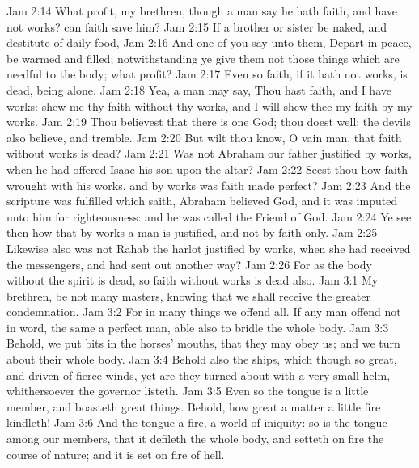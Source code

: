 \vs Jam 2:14 What  profit, my brethren, though a man say he hath faith, and have not works? can faith save him?
\vs Jam 2:15 If a brother or sister be naked, and destitute of daily food,
\vs Jam 2:16 And one of you say unto them, Depart in peace, be  warmed and filled; notwithstanding ye give them not those things which are needful to the body; what  profit?
\vs Jam 2:17 Even so faith, if it hath not works, is dead, being alone.
\vs Jam 2:18 Yea, a man may say, Thou hast faith, and I have works: shew me thy faith without thy works, and I will shew thee my faith by my works.
\vs Jam 2:19 Thou believest that there is one God; thou doest well: the devils also believe, and tremble.
\vs Jam 2:20 But wilt thou know, O vain man, that faith without works is dead?
\vs Jam 2:21 Was not Abraham our father justified by works, when he had offered Isaac his son upon the altar?
\vs Jam 2:22 Seest thou how faith wrought with his works, and by works was faith made perfect?
\vs Jam 2:23 And the scripture was fulfilled which saith, Abraham believed God, and it was imputed unto him for righteousness: and he was called the Friend of God.
\vs Jam 2:24 Ye see then how that by works a man is justified, and not by faith only.
\vs Jam 2:25 Likewise also was not Rahab the harlot justified by works, when she had received the messengers, and had sent  out another way?
\vs Jam 2:26 For as the body without the spirit is dead, so faith without works is dead also.
\vs Jam 3:1 My brethren, be not many masters, knowing that we shall receive the greater condemnation.
\vs Jam 3:2 For in many things we offend all. If any man offend not in word, the same  a perfect man,  able also to bridle the whole body.
\vs Jam 3:3 Behold, we put bits in the horses' mouths, that they may obey us; and we turn about their whole body.
\vs Jam 3:4 Behold also the ships, which though  so great, and  driven of fierce winds, yet are they turned about with a very small helm, whithersoever the governor listeth.
\vs Jam 3:5 Even so the tongue is a little member, and boasteth great things. Behold, how great a matter a little fire kindleth!
\vs Jam 3:6 And the tongue  a fire, a world of iniquity: so is the tongue among our members, that it defileth the whole body, and setteth on fire the course of nature; and it is set on fire of hell.
